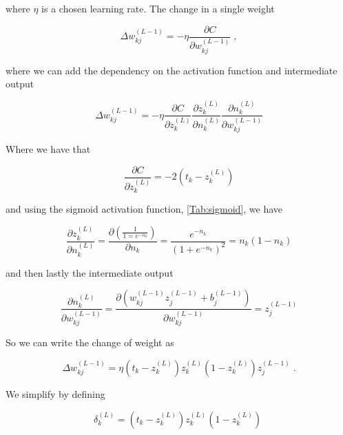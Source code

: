 where $\eta$ is a chosen learning rate. The change in a single weight

\begin{equation}
    \Delta w_{kj}^{(L-1)}  = -\eta \frac{\partial C}{\partial w_{kj}^{(L-1)}} \; ,
\end{equation}

where we can add the dependency on the activation function and intermediate output

\begin{equation}
    \Delta w_{kj}^{(L-1)} = -\eta \frac{\partial C}{\partial z_k^{(L)}}\frac{\partial z_k^{(L)}}{\partial n_k^{(L)}}\frac{\partial n_k^{(L)}}{\partial w_{kj}^{(L-1)}}
\end{equation}

Where we have that

\begin{equation}
    \frac{\partial C}{\partial z_k^{(L)}} = - 2 \left ( t_k - z_k^{(L)} \right )
\end{equation}

and using the sigmoid activation function, \ref{Tab:sigmoid}, we have

\begin{equation} \label{eq:outnet}
    \frac{\partial z_k^{(L)}}{\partial n_k^{(L)}} = \frac{\partial \left ( \frac{1}{1 = e^{-n_k}} \right )}{\partial n_k} = \frac{e^{-n_k}}{\left (1+e^{-n_k} \right ) ^2} = n_k(1-n_k)
\end{equation}

 and then lastly the intermediate output 
 
\begin{equation} \label{eq:netweight}
    \frac{\partial n_k^{(L)}}{\partial w_{kj}^{(L-1)}} = \frac{\partial \left ( w_{kj}^{(L-1)} z_j^{(L-1)} + b_j^{(L-1)} \right )}{\partial  w_{kj}^{(L-1)}} = z_j^{(L-1)}
\end{equation}

So we can write the change of weight as

\begin{equation}
    \Delta w_{kj}^{(L-1)} = \eta \left ( t_k - z_k^{(L)} \right ) z_k^{(L)} \left ( 1 - z_k^{(L)} \right ) z_j^{(L-1)}  \; .
\end{equation}

We simplify by defining

\begin{equation}
    \delta_k^{(L)} = \left ( t_k - z_k^{(L)} \right ) z_k^{(L)} \left ( 1 - z_k^{(L)} \right ) \;
\end{equation}

